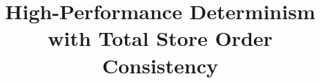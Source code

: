 \documentclass{sigplanconf}
\begin{document}
\setlength{\pdfpageheight}{\paperheight}
\setlength{\pdfpagewidth}{\paperwidth}






\title{\Large \bf High-Performance Determinism with Total Store Order Consistency}


\maketitle


\newcommand{\checkout}{{\tt checkout()}}
\newcommand{\settled}{{\tt commit()}}
\newcommand{\settledm}{{\tt commit\_mutex()}}
\newcommand{\update}{{\tt update()}}
\newcommand{\updatem}{{\tt update\_mutex()}}
\newcommand{\commit}{{\tt commit()}}
\newcommand{\commitm}{{\tt commit\_mutex()}}
\newcommand{\mksnap}{{\tt commit()}}
\newcommand{\getsnap}{{\tt update()}}
\newcommand{\fork}{{\tt fork}}
\newcommand{\pte}{{\tt pte}}
\newcommand{\determEnd}{{\tt determ\_end}}
\newcommand{\pthread}{{\tt pthread}}


\newcommand{\create}{{\tt pthread\_create}}
\newcommand{\dthreads}{Dthreads}



\newcommand{\conversion}{{\sc \small Conversion}}
\newcommand{\lib}{{\sc \small Consequence}\xspace}
\newcommand{\libnodet}{{\sc \small Consequence-NoDet}\xspace}
\newcommand{\Lib}{{\sc \large Consequence}\xspace}
\end{document}
